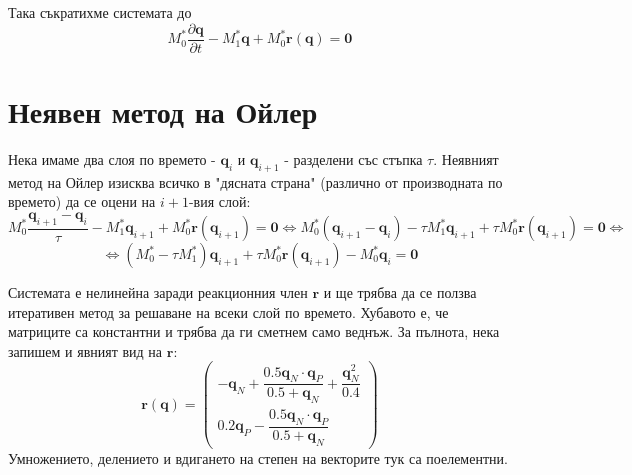 \documentclass[fleqn,12pt]{article}
\begin{document}
Така съкратихме системата до 
\[ M_0^* \frac{\partial \pmb{q}}{\partial t} - M_1^* \pmb{q} + M_0^* \pmb{r}(\pmb{q}) = \pmb{0}  \]

\section{Неявен метод на Ойлер}
Нека имаме два слоя по времето - $\pmb{q}_{i}$ и $\pmb{q}_{i+1}$ - разделени със стъпка $\tau$.
Неявният метод на Ойлер изисква всичко в "дясната страна" (различно от производната по времето)
да се оцени на $i+1$-вия слой:
\[ M_0^* \frac{\pmb{q}_{i+1} - \pmb{q}_i}{\tau} - M_1^* \pmb{q}_{i+1} + M_0^* \pmb{r}(\pmb{q}_{i+1}) = \pmb{0}  
\Leftrightarrow M_0^* (\pmb{q}_{i+1} - \pmb{q}_i) - \tau M_1^* \pmb{q}_{i+1} + \tau M_0^* \pmb{r}(\pmb{q}_{i+1}) = \pmb{0} 
\Leftrightarrow\]
\[ \Leftrightarrow (M_0^* - \tau M_1^*) \pmb{q}_{i+1} + \tau M_0^* \pmb{r}(\pmb{q}_{i+1}) - M_0^* \pmb{q}_i = \pmb{0} \]

Системата е нелинейна заради реакционния член $\pmb{r}$ и ще трябва да се ползва итеративен метод за решаване на всеки слой по времето.
Хубавото е, че матриците са константни и трябва да ги сметнем само веднъж. За пълнота, нека запишем и явният вид на $\pmb{r}$:
\[ \pmb{r}(\pmb{q}) = \begin{pmatrix} 
-\pmb{q}_N + \dfrac{0.5 \pmb{q}_N \cdot \pmb{q}_P}{0.5 + \pmb{q}_N} + \dfrac{\pmb{q}_N^2}{0.4} \\[5mm]
0.2 \pmb{q}_P - \dfrac{0.5 \pmb{q}_N \cdot \pmb{q}_P}{0.5 + \pmb{q}_N} 
\end{pmatrix} \]
Умножението, делението и вдигането на степен на векторите тук са поелементни.
\end{document}
